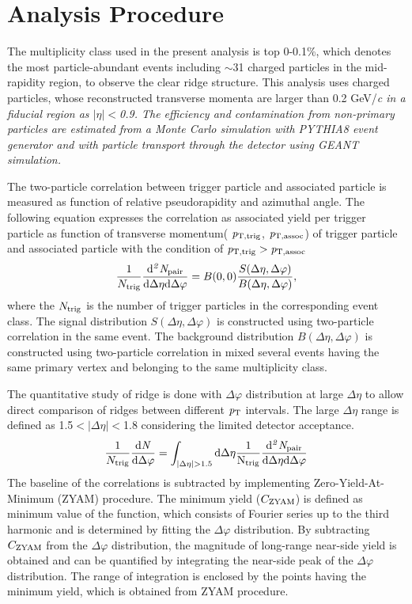 \documentclass[ALICE,manyauthors]{cernphprep}
\begin{document}
\section{Analysis Procedure}

The multiplicity class used in the present analysis is top 0-0.1\%, which denotes the most particle-abundant events including  $\sim$31 charged particles in the mid-rapidity region, to observe the clear ridge structure. This analysis uses charged particles, whose reconstructed transverse momenta are larger than 0.2 GeV/\it{c}\rm{} in a fiducial region as $|\eta|<$0.9. The efficiency and contamination from non-primary particles are estimated from a Monte Carlo simulation with PYTHIA8 event generator and with particle transport through the detector using GEANT simulation.

The two-particle correlation between trigger particle and associated particle is measured as function of relative pseudorapidity and azimuthal angle. The following equation expresses the correlation as associated yield per trigger particle as function of transverse momentum( $\it{p}_{\rm{T, trig}}$, $\it{p}_{\rm{T, assoc}}$) of trigger particle and associated particle with the condition of $\it{p}_{\rm{T, trig}} > \it{p}_{\rm{T, assoc}}$
\begin{eqnarray}
\frac{1}{N_{\rm{trig}}} \frac{ \rm{d}\it{}^{2} N_{\rm{pair}} }{ \rm{d} \Delta\eta \rm{d}\Delta\varphi} = B(0, 0)\frac{S(\Delta\eta, \Delta\varphi)}{B(\Delta\eta, \Delta\varphi)},
\end{eqnarray}
where the $N_{\rm{trig}}$ is the number of trigger particles in the corresponding event class. The signal distribution $S(\Delta\eta, \Delta\varphi)$ is constructed using two-particle correlation in the same event. The background distribution $B(\Delta\eta, \Delta\varphi)$ is constructed using two-particle correlation in mixed several events having the same primary vertex and belonging to the same multiplicity class.

The quantitative study of ridge is done with $\Delta\varphi$ distribution at large $\Delta\eta$ to allow direct comparison of ridges between different $\it{p}_{\rm{T}}$ intervals. The large $\Delta\eta$ range is defined as 1.5$<|\Delta\eta|<$1.8 considering the limited detector acceptance.
\begin{eqnarray}
\frac{1}{N_{\rm{trig}}} \frac{ \rm{d}\it{}N }{ \rm{d}\Delta\varphi } = \int_{|\Delta \eta|>1.5} \rm{d} \Delta \eta \frac{1}{N_{\rm{trig}}} \frac{ \rm{d}\it{}^{2} N_{\rm{pair}} }{ \rm{d}\Delta\eta \rm{d}\Delta\varphi}
\end{eqnarray}
The baseline of the correlations is subtracted by implementing Zero-Yield-At-Minimum (ZYAM) procedure. The minimum yield ($C_{\rm{ZYAM}}$) is defined as minimum value of the function, which consists of Fourier series up to the third harmonic and is determined by fitting the $\Delta\varphi$ distribution. By subtracting $C_{\rm{ZYAM}}$ from the $\Delta\varphi$ distribution, the magnitude of long-range near-side yield is obtained and can be quantified by integrating the near-side peak of the $\Delta\varphi$ distribution. The range of integration is enclosed by the points having the minimum yield, which is obtained from ZYAM procedure.
\end{document}
